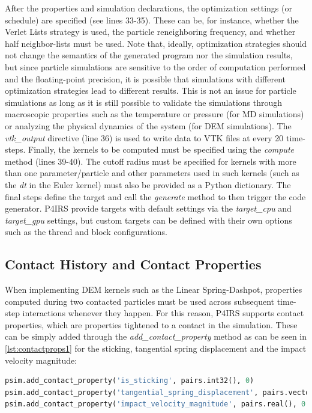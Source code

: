 \documentclass[preprint,12pt]{elsarticle}
\begin{document}
After the properties and simulation declarations, the optimization settings (or schedule) are specified (see lines 33-35).
These can be, for instance, whether the Verlet Lists strategy is used, the particle reneighboring frequency, and whether half neighbor-lists must be used.
Note that, ideally, optimization strategies should not change the semantics of the generated program nor the simulation results, but since particle simulations are sensitive to the order of computation performed and the floating-point precision, it is possible that simulations with different optimization strategies lead to different results.
This is not an issue for particle simulations as long as it is still possible to validate the simulations through macroscopic properties such as the temperature or pressure (for \ac{MD} simulations) or analyzing the physical dynamics of the system (for \ac{DEM} simulations).
The \emph{vtk\_output} directive (line 36) is used to write data to VTK files at every 20 time-steps.
Finally, the kernels to be computed must be specified using the \emph{compute} method (lines 39-40).
The cutoff radius must be specified for kernels with more than one parameter/particle and other parameters used in such kernels (such as the \emph{dt} in the Euler kernel) must also be provided as a Python dictionary.
The final steps define the target and call the \emph{generate} method to then trigger the code generator.
P4IRS provide targets with default settings via the \emph{target\_cpu} and \emph{target\_gpu} settings, but custom targets can be defined with their own options such as the thread and block configurations.

\subsection{Contact History and Contact Properties}
\label{sec:contact_history}

When implementing DEM kernels such as the Linear Spring-Dashpot, properties computed during two contacted particles must be used across subsequent time-step interactions whenever they happen.
For this reason, P4IRS supports contact properties, which are properties tightened to a contact in the simulation.
These can be simply added through the \emph{add\_contact\_property} method as can be seen in \autoref{lst:contactprops1} for the sticking, tangential spring displacement and the impact velocity magnitude:

\begin{lstlisting}[language=Python,
		   label={lst:contactprops1},
		   caption={Setup example for contact properties.}]
psim.add_contact_property('is_sticking', pairs.int32(), 0)
psim.add_contact_property('tangential_spring_displacement', pairs.vector(), [0.0, 0.0, 0.0])
psim.add_contact_property('impact_velocity_magnitude', pairs.real(), 0.0)
\end{lstlisting}
\end{document}
